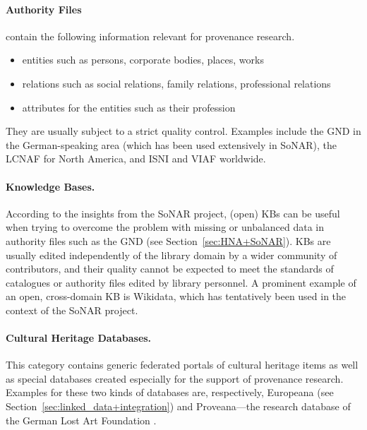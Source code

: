 \paragraph{Authority Files}
%
contain the following information relevant for provenance research.
%
\begin{itemize}
  \item
    entities such as persons, corporate bodies, places, works
  \item
    relations such as social relations, family relations, professional relations
  \item
    attributes for the entities such as their profession
\end{itemize}
%
They are usually subject to a strict quality control.
Examples include the \gls{GND} in the German-speaking area (which has been used extensively in \gls{SoNAR}),
the \gls{LCNAF} for North America,
and \gls{ISNI} and \gls{VIAF} worldwide.

\paragraph{Knowledge Bases.}

According to the insights from the \gls{SoNAR} project,
(open) \glspl{KB} can be useful when trying to overcome the problem with missing or unbalanced data
in authority files such as the \gls{GND} (see Section~\ref{sec:HNA+SoNAR}).
\Glspl{KB} are usually edited independently of the library domain by a wider community of contributors,
and their quality cannot be expected to meet the standards of catalogues or authority files edited by library personnel.
A prominent example of an open, cross-domain \gls{KB} is Wikidata,
which has tentatively been used in the context of the \gls{SoNAR} project.

\paragraph{Cultural Heritage Databases.}

This category contains generic federated portals of cultural heritage items
as well as special databases created especially for the support of provenance research.
Examples for these two kinds of databases are, respectively, Europeana (see Section~\ref{sec:linked_data+integration})
and Proveana---the research database of the German Lost Art Foundation \cite{Proveana}.

